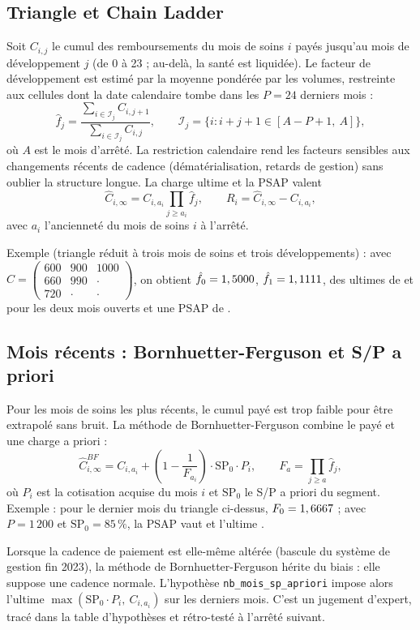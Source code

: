 \documentclass[11pt,a4paper]{article}
\begin{document}
\subsection{Triangle et Chain Ladder}
Soit $C_{i,j}$ le cumul des remboursements du mois de soins $i$ payés jusqu'au mois de développement $j$ (de 0 à 23 ; au-delà, la santé est liquidée). Le facteur de développement est estimé par la moyenne pondérée par les volumes, restreinte aux cellules dont la date calendaire tombe dans les $P = 24$ derniers mois :
\[
\hat f_j = \frac{\sum_{i \in \mathcal{I}_j} C_{i,j+1}}{\sum_{i \in \mathcal{I}_j} C_{i,j}}, \qquad
\mathcal{I}_j = \{ i : i + j + 1 \in [A - P + 1,\ A] \},
\]
où $A$ est le mois d'arrêté. La restriction calendaire rend les facteurs sensibles aux changements récents de cadence (dématérialisation, retards de gestion) sans oublier la structure longue. La charge ultime et la PSAP valent
\[
\hat C_{i,\infty} = C_{i,a_i} \prod_{j \ge a_i} \hat f_j, \qquad R_i = \hat C_{i,\infty} - C_{i,a_i},
\]
avec $a_i$ l'ancienneté du mois de soins $i$ à l'arrêté.

Exemple (triangle réduit à trois mois de soins et trois développements) : avec $C = \begin{pmatrix}600&900&1000\\660&990&\cdot\\720&\cdot&\cdot\end{pmatrix}$, on obtient $\hat f_0 = 1,5000$, $\hat f_1 = 1,1111$, des ultimes de \cljUa{} et \cljUb{} pour les deux mois ouverts et une PSAP de \cljR.

\subsection{Mois récents : Bornhuetter-Ferguson et S/P a priori}
Pour les mois de soins les plus récents, le cumul payé est trop faible pour être extrapolé sans bruit. La méthode de Bornhuetter-Ferguson combine le payé et une charge a priori :
\[
\hat C^{BF}_{i,\infty} = C_{i,a_i} + \left(1 - \frac{1}{F_{a_i}}\right) \cdot \mathrm{SP}_0 \cdot P_i, \qquad F_{a} = \prod_{j \ge a} \hat f_j,
\]
où $P_i$ est la cotisation acquise du mois $i$ et $\mathrm{SP}_0$ le S/P a priori du segment. Exemple : pour le dernier mois du triangle ci-dessus, $F_0 = 1,6667$ ; avec $P = 1\,200$ et $\mathrm{SP}_0 = 85\,\%$, la PSAP vaut \bfR{} et l'ultime \bfU.

Lorsque la cadence de paiement est elle-même altérée (bascule du système de gestion fin 2023), la méthode de Bornhuetter-Ferguson hérite du biais : elle suppose une cadence normale. L'hypothèse \texttt{nb\_mois\_sp\_apriori} impose alors l'ultime $\max(\mathrm{SP}_0 \cdot P_i,\ C_{i,a_i})$ sur les derniers mois. C'est un jugement d'expert, tracé dans la table d'hypothèses et rétro-testé à l'arrêté suivant.
\end{document}

